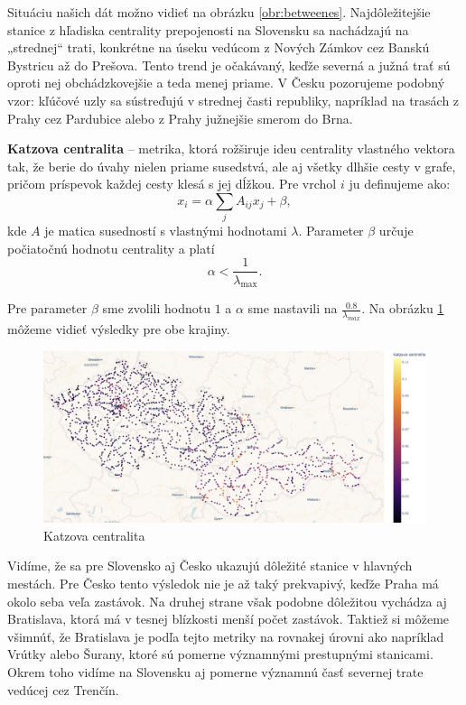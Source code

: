 \documentclass[main.tex]{subfiles}
\begin{document}
Situáciu našich dát možno vidieť na obrázku \ref{obr:betweenes}. Najdôležitejšie stanice z hľadiska centrality prepojenosti na Slovensku sa nachádzajú na „strednej“ trati, konkrétne na úseku vedúcom z Nových Zámkov cez Banskú Bystricu až do Prešova. Tento trend je očakávaný, keďže severná a južná trať sú oproti nej obchádzkovejšie a teda menej priame. V Česku pozorujeme podobný vzor: kľúčové uzly sa sústreďujú v strednej časti republiky, napríklad na trasách z Prahy cez Pardubice alebo z Prahy južnejšie smerom do Brna.

\textbf{Katzova centralita} -- metrika, ktorá rožširuje ideu centrality vlastného vektora tak, že berie do úvahy nielen priame susedstvá,  ale aj všetky dlhšie cesty v grafe, pričom príspevok každej cesty klesá s jej dĺžkou. Pre vrchol $i$ ju definujeme ako:
\begin{equation*}
    x_i = \alpha \sum_{j} A_{ij} x_j + \beta,
\end{equation*}
kde $A$ je matica susedností s vlastnými hodnotami $\lambda$.
Parameter $\beta$ určuje počiatočnú hodnotu centrality a platí
\begin{equation*}
    \alpha < \frac{1}{\lambda_{\max}}.    
\end{equation*}

Pre parameter $\beta$ sme zvolili hodnotu $1$ a $\alpha$ sme nastavili na $\frac{0.8}{\lambda_{max}}$. Na obrázku \ref{obr:katz} môžeme vidieť výsledky pre obe krajiny.

\begin{figure}
    \centerline{\includegraphics[width=1.2\textwidth]{images/katz.png}}
    \caption{Katzova centralita}
    \label{obr:katz}
\end{figure}

Vidíme, že sa pre Slovensko aj Česko ukazujú dôležité stanice v hlavných mestách.
Pre Česko tento výsledok nie je až taký prekvapivý, keďže Praha má okolo seba veľa zastávok. Na druhej strane však podobne dôležitou vychádza aj Bratislava, ktorá má v tesnej blízkosti menší počet zastávok.
Taktiež si môžeme všimnúť, že Bratislava je podľa tejto metriky na rovnakej úrovni ako napríklad Vrútky alebo Šurany, ktoré sú pomerne významnými prestupnými stanicami.
Okrem toho vidíme na Slovensku aj pomerne významnú časť severnej trate vedúcej cez Trenčín.
\end{document}
